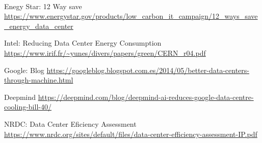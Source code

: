 \documentclass[10pt]{article}
\begin{document}
    	\paragraph{}
	\clearpage
    \begin{thebibliography}{9}

  		Enegy Star: 12 Way save \url{https://www.energystar.gov/products/low_carbon_it_campaign/12_ways_save_energy_data_center}

        Intel: Reducing Data Center Energy Consumption \url{https://www.irif.fr/~yunes/divers/papers/green/CERN_r04.pdf}

        Google: Blog \url{https://googleblog.blogspot.com.es/2014/05/better-data-centers-through-machine.html}

        Deepmind \url{https://deepmind.com/blog/deepmind-ai-reduces-google-data-centre-cooling-bill-40/}

        NRDC: Data Center Eficiency Assessment \url{https://www.nrdc.org/sites/default/files/data-center-efficiency-assessment-IP.pdf}

	\end{thebibliography}
\end{document}
